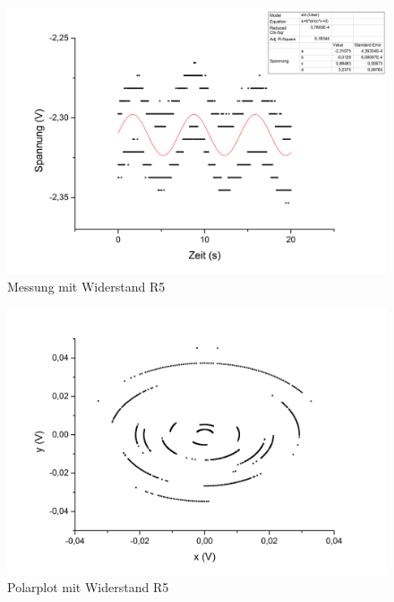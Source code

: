 \begin{figure}[h]
\begin{center}
\includegraphics[scale=0.6]{Bilder/w5}
\caption{Messung mit Widerstand R5}
\end{center}
\end{figure}
\begin{figure}[h]
\begin{center}
\includegraphics[scale=0.6]{Bilder/pw5}
\caption{Polarplot mit Widerstand R5}
\end{center}
\end{figure}
